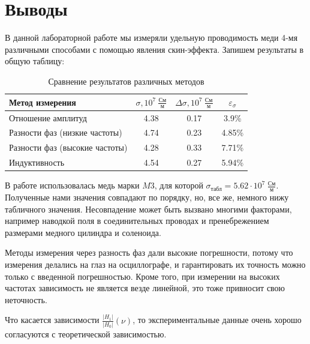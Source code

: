\documentclass[a4paper, 12pt]{article}
\begin{document}
\section*{Выводы}
В данной лабораторной работе мы измеряли удельную проводимость меди 4-мя различными способами с помощью явления скин-эффекта. Запишем результаты в общую таблицу:

\begin{table}[!h]
	\begin{center}
		\begin{tabular}{|l|c|c|c|}
			\hline
			Метод измерения & $\sigma, 10^{7} \ \frac{\text{См}}{\text{м}}$ & $\Delta\sigma, 10^{7} \ \frac{\text{См}}{\text{м}}$ & $\varepsilon_{\sigma}$\\
			\hline
			Отношение амплитуд & 4.38 & 0.17 & 3.9\%\\ \hline
			Разности фаз (низкие частоты) & 4.74 & 0.23 & 4.85\%\\ \hline
			Разности фаз (высокие частоты) & 4.28 & 0.33 & 7.71\%\\ \hline
			Индуктивность & 4.54 & 0.27 & 5.94\%\\ \hline
			
		\end{tabular}
	\end{center}
	\caption{Сравнение результатов различных методов}\label{}
\end{table}

В работе использовалась медь марки $M3$, для которой $\sigma_{\text{табл}} = 5.62\cdot10^{7} \ \frac{\text{См}}{\text{м}}$.
Полученные нами значения совпадают по порядку, но, все же, немного нижу табличного значения. Несовпадение может быть вызвано многими факторами, например наводкой поля в соединительных проводах и пренебрежением размерами медного цилиндра и соленоида. 

Методы измерения через разность фаз дали высокие погрешности, потому что измерения делались на глаз на осциллографе, и гарантировать их точность можно только с введенной погрешностью. Кроме того, при измерении на высоких частотах зависимость не является везде линейной, это тоже привносит свою неточность.

Что касается зависимости $\frac{|H_1|}{|H_0|}(\nu)$, то экспериментальные данные очень хорошо согласуются с теоретической зависимостью.
\end{document}
